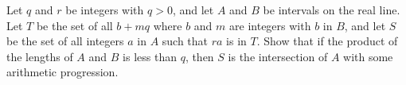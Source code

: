 Let $q$ and $r$ be integers with $q>0$, and let $A$ and $B$ be intervals on the real line. Let $T$ be the set of all $b+mq$ where $b$ and $m$ are integers with $b$ in $B$, and let $S$ be the set of all integers $a$ in $A$ such that $ra$ is in $T$. Show that if the product of the lengths of $A$ and $B$ is less than $q$, then $S$ is the intersection of $A$ with some arithmetic progression.
